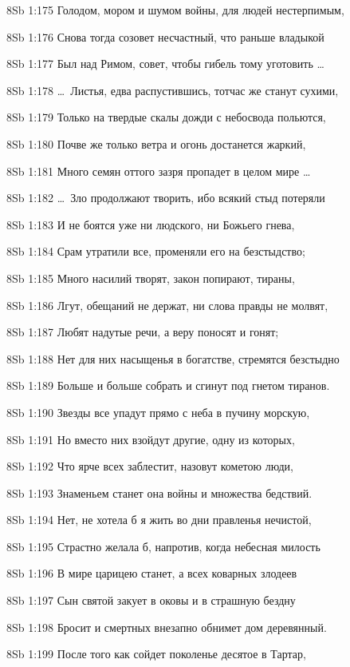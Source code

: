 \vs 8Sb 1:175 Голодом, мором и шумом войны, для людей нестерпимым,

\vs 8Sb 1:176 Снова тогда созовет несчастный, что раньше владыкой

\vs 8Sb 1:177 Был над Римом, совет, чтобы гибель тому уготовить \ldots

\vs 8Sb 1:178 \ldots\ Листья, едва распустившись, тотчас же станут сухими,

\vs 8Sb 1:179 Только на твердые скалы дожди с небосвода польются, 

\vs 8Sb 1:180 Почве же только ветра и огонь достанется жаркий, 

\vs 8Sb 1:181 Много семян оттого зазря пропадет в целом мире \ldots

\vs 8Sb 1:182 \ldots\ Зло продолжают творить, ибо всякий стыд потеряли 

\vs 8Sb 1:183 И не боятся уже ни людского, ни Божьего гнева, 

\vs 8Sb 1:184 Срам утратили все, променяли его на безстыдство; 

\vs 8Sb 1:185 Много насилий творят, закон попирают, тираны, 

\vs 8Sb 1:186 Лгут, обещаний не держат, ни слова правды не молвят, 

\vs 8Sb 1:187 Любят надутые речи, а веру поносят и гонят; 

\vs 8Sb 1:188 Нет для них насыщенья в богатстве, стремятся безстыдно 

\vs 8Sb 1:189 Больше и больше собрать  и сгинут под гнетом тиранов.

\vs 8Sb 1:190 Звезды все упадут прямо с неба в пучину морскую, 

\vs 8Sb 1:191 Но вместо них взойдут другие, одну из которых, 

\vs 8Sb 1:192 Что ярче всех заблестит, назовут кометою люди, 

\vs 8Sb 1:193 Знаменьем станет она войны и множества бедствий.

\vs 8Sb 1:194 Нет, не хотела б я жить во дни правленья нечистой, 

\vs 8Sb 1:195 Страстно желала б, напротив, когда небесная милость 

\vs 8Sb 1:196 В мире царицею станет, а всех коварных злодеев 

\vs 8Sb 1:197 Сын святой закует в оковы и в страшную бездну 

\vs 8Sb 1:198 Бросит  и смертных внезапно обнимет дом деревянный.

\vs 8Sb 1:199 После того как сойдет поколенье десятое в Тартар, 

